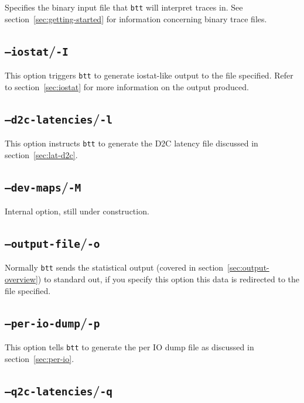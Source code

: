 \documentclass{article}
\begin{document}
  Specifies the binary input file that \texttt{btt} will interpret traces
  in. See section~\ref{sec:getting-started} for information concerning
  binary trace files.

\subsection{\label{sec:o-I}\texttt{--iostat}/\texttt{-I}}

  This option triggers \texttt{btt} to generate iostat-like output to the
  file specified. Refer to section~\ref{sec:iostat} for more information
  on the output produced.

\subsection{\label{sec:o-l}\texttt{--d2c-latencies}/\texttt{-l}}

  This option instructs \texttt{btt} to generate the D2C latency file
  discussed in section~\ref{sec:lat-d2c}.

\subsection{\label{sec:o-M}\texttt{--dev-maps}/\texttt{-M}}

  Internal option, still under construction.

\subsection{\label{sec:o-o}\texttt{--output-file}/\texttt{-o}}

  Normally \texttt{btt} sends the statistical output (covered in
  section~\ref{sec:output-overview}) to standard out, if you specify
  this option this data is redirected to the file specified.

\subsection{\label{sec:o-p}\texttt{--per-io-dump}/\texttt{-p}}

  This option tells \texttt{btt} to generate the per IO dump file as
  discussed in section~\ref{sec:per-io}.

\subsection{\label{sec:o-q}\texttt{--q2c-latencies}/\texttt{-q}}
\end{document}
